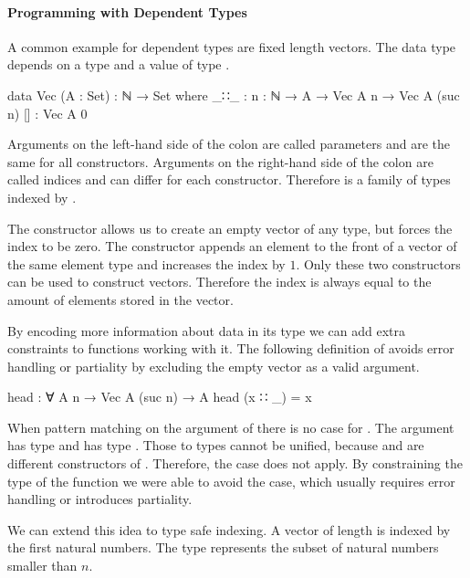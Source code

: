 \documentclass[10pt,a4paper,twoside]{report}
\begin{document}
\paragraph{Programming with Dependent Types}

A common example for dependent types are fixed length vectors.
The data type depends on a type  and a value of type
.

\begin{code}
data Vec (A : Set) : ℕ → Set where
  _∷_  : {n : ℕ} → A → Vec A n → Vec A (suc n)
  []   : Vec A 0
\end{code}
Arguments on the left-hand side of the colon are called parameters and are the
same for all constructors.
Arguments on the right-hand side of the colon are called indices and can differ
for each constructor.
Therefore \AgdaSpace{} is a family of types
indexed by .

The \AgdaInductiveConstructor{[]} constructor allows us to create an empty
vector of any type, but forces the index to be zero.
The  constructor appends an element to the front
of a vector of the same element type and increases the index by $1$.
Only these two constructors can be used to construct vectors.
Therefore the index is always equal to the amount of elements stored in the
vector.

By encoding more information about data in its type we can add extra constraints
to functions working with it.
The following definition of  avoids error handling or
partiality by excluding the empty vector as a valid argument.

\begin{code}
head : ∀ {A n} → Vec A (suc n) → A
head (x ∷ _) = x
\end{code}
When pattern matching on the argument of  there is no case
for \AgdaInductiveConstructor{[]}.
The argument has type  and
\AgdaInductiveConstructor{[]} has type .
Those to types cannot be unified, because  and
 are different constructors of .
Therefore, the \AgdaInductiveConstructor{[]} case does not apply.
By constraining the type of the function we were able to avoid the case, which
usually requires error handling or introduces partiality.

We can extend this idea to type safe indexing.
A vector of length  is indexed by the first 
natural numbers.
The type \AgdaSpace{} represents the subset of
natural numbers smaller than $n$.
\end{document}
